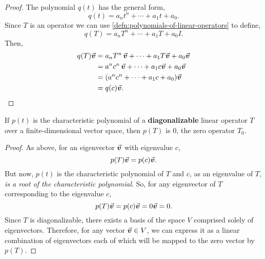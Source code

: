 \documentclass[../MathsNotesBase.tex]{subfiles}
\begin{document}
{	
		\bigskip
		\begin{proof}
			The polynomial $q(t)$ has the general form,
			\[ q(t) = a_n t^n + \cdots + a_1 t + a_0. \]
			Since $T$ is an operator we can use \ref{defn:polynomials-of-linear-operators} to define,
			\[ q(T) = a_n T^n + \cdots + a_1 T + a_0 I. \]
			Then,
			\[\begin{aligned}
				q(T)\vec{\bm{v}} &= a_n T^n \, \vec{\bm{v}} + \cdots + a_1 T \vec{\bm{v}} + a_0 \vec{\bm{v}} \\
				&= a^n c^n \, \vec{\bm{v}} + \cdots + a_1 c \vec{\bm{v}} + a_0 \vec{\bm{v}} \\
				&= (a^n c^n + \cdots + a_1 c + a_0) \vec{\bm{v}} \\
				&= q(c)\vec{\bm{v}}. \qedhere
			\end{aligned}\]
		\end{proof}
		\begin{corollary}
			If $p(t)$ is the characteristic polynomial of a \textbf{diagonalizable} linear operator $T$ over a finite-dimensional vector space, then $p(T)$ is 0, the zero operator $T_0$.
		\end{corollary}
		\begin{proof}
			As above, for an eigenvector $\vec{\bm{v}}$ with eigenvalue $c$,
			\[ p(T)\vec{\bm{v}} = p(c)\vec{\bm{v}}. \]
			But now, $p(t)$ is the characteristic polynomial of $T$ and $c$, as an eigenvalue of $T$, \textit{is a root of the characteristic polynomial}. So, for any eigenvector of $T$ corresponding to the eigenvalue $c$,
			\[  p(T)\vec{\bm{v}} = p(c)\vec{\bm{v}} = 0\vec{\bm{v}} = 0. \]
			Since $T$ is diagonalizable, there exists a basis of the space $V$ comprised solely of eigenvectors. Therefore, for any vector ${ \vec{\bm{v}} \in V }$, we can express it as a linear combination of eigenvectors each of which will be mapped to the zero vector by $p(T)$.
		\end{proof}
	
}
\end{document}
